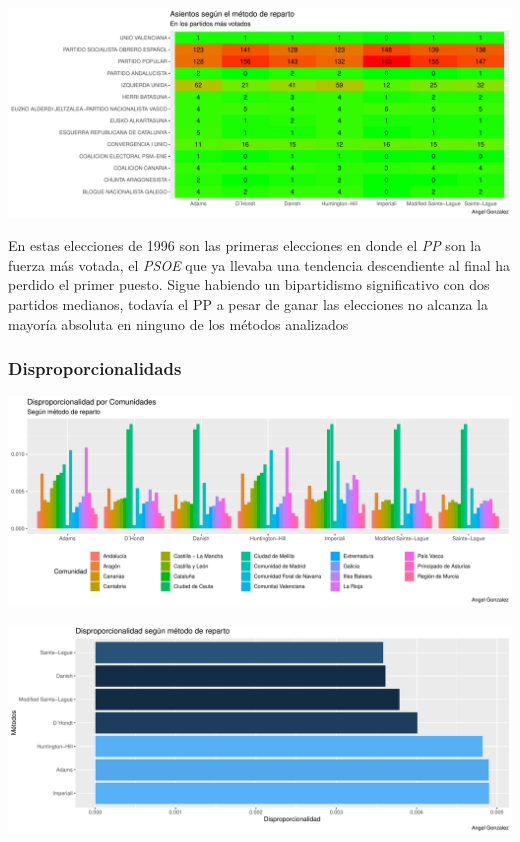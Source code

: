 \documentclass[12pt,a4paper,]{book}
\numberwithin{dummy}{section}
\theoremstyle{ocrenumbox}
\theoremstyle{blacknumex}
\theoremstyle{blacknumbox}
\theoremstyle{ocrenum}
\theoremstyle{ocrenum}
\begin{document}
\begin{center}\includegraphics[width=0.95\linewidth]{figurasR/unnamed-chunk-113-2} \end{center}

En estas elecciones de 1996 son las primeras elecciones en donde el
\emph{PP} son la fuerza más votada, el \emph{PSOE} que ya llevaba una
tendencia descendiente al final ha perdido el primer puesto. Sigue
habiendo un bipartidismo significativo con dos partidos medianos,
todavía el PP a pesar de ganar las elecciones no alcanza la mayoría
absoluta en ninguno de los métodos analizados

\hypertarget{disproporcionalidads}{%
\subsubsection{Disproporcionalidads}\label{disproporcionalidads}}

\begin{center}\includegraphics[width=0.95\linewidth]{figurasR/unnamed-chunk-114-1} \end{center}

\begin{center}\includegraphics[width=0.95\linewidth]{figurasR/unnamed-chunk-114-2} \end{center}
\end{document}

